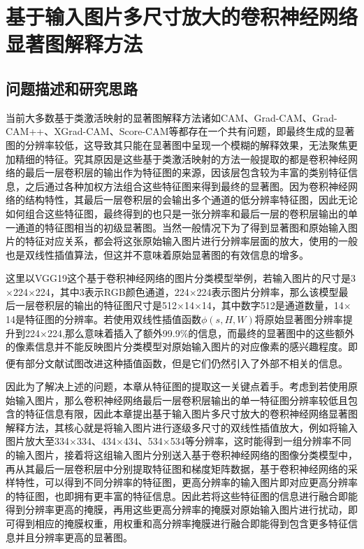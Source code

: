 


\chapter[基于输入图片多尺寸放大的卷积神经网络显著图解释方法]{\texorpdfstring{基于输入图片多尺寸放大的卷积神经网络\\显著图解释方法}{基于输入图片多尺寸放大的卷积神经网络显著图解释方法}}
\thispagestyle{others}
\pagestyle{others}
\xiaosi




\section{问题描述和研究思路}
当前大多数基于类激活映射的显著图解释方法诸如CAM、Grad-CAM、Grad-CAM++、XGrad-CAM、Score-CAM等都存在一个共有问题，即最终生成的显著图的分辨率较低，这导致其只能在显著图中呈现一个模糊的解释效果，无法聚焦更加精细的特征。究其原因是这些基于类激活映射的方法一般提取的都是卷积神经网络的最后一层卷积层的输出作为特征图的来源，因该层包含较为丰富的类别特征信息，之后通过各种加权方法组合这些特征图来得到最终的显著图。因为卷积神经网络的结构特性，其最后一层卷积层的会输出多个通道的低分辨率特征图，因此无论如何组合这些特征图，最终得到的也只是一张分辨率和最后一层的卷积层输出的单一通道的特征图相当的初级显著图。当然一般情况下为了得到显著图和原始输入图片的特征对应关系，都会将这张原始输入图片进行分辨率层面的放大，使用的一般也是双线性插值算法，但这并不意味着原始显著图的有效信息的增多。

这里以VGG19这个基于卷积神经网络的图片分类模型举例，若输入图片的尺寸是3$\times$224$\times$224，其中3表示RGB颜色通道，224$\times$224表示图片分辨率，那么该模型最后一层卷积层的输出的特征图尺寸是512$\times$14$\times$14，其中数字512是通道数量，14$\times$14是特征图的分辨率。若使用双线性插值函数$\phi(s,H,W)$将原始显著图分辨率提升到224$\times$224,那么意味着插入了额外99.9\%的信息，而最终的显著图中的这些额外的像素信息并不能反映图片分类模型对原始输入图片的对应像素的感兴趣程度。即便有部分文献\textsuperscript{\cite{adebayo2018sanity,selvaraju2017grad}}试图改进这种插值函数，但是它们仍然引入了外部不相关的信息。

因此为了解决上述的问题，本章从特征图的提取这一关键点着手。考虑到若使用原始输入图片，那么卷积神经网络最后一层卷积层输出的单一特征图分辨率较低且包含的特征信息有限，因此本章提出基于输入图片多尺寸放大的卷积神经网络显著图解释方法，其核心就是将输入图片进行逐级多尺寸的双线性插值放大，例如将输入图片放大至334$\times$334、434$\times$434、534$\times$534等分辨率，这时能得到一组分辨率不同的输入图片，接着将这组输入图片分别送入基于卷积神经网络的图像分类模型中，再从其最后一层卷积层中分别提取特征图和梯度矩阵数据，基于卷积神经网络的采样特性，可以得到不同分辨率的特征图，更高分辨率的输入图片即对应更高分辨率的特征图，也即拥有更丰富的特征信息。因此若将这些特征图的信息进行融合即能得到分辨率更高的掩膜，再用这些更高分辨率的掩膜对原始输入图片进行扰动，即可得到相应的掩膜权重，用权重和高分辨率掩膜进行融合即能得到包含更多特征信息并且分辨率更高的显著图。
